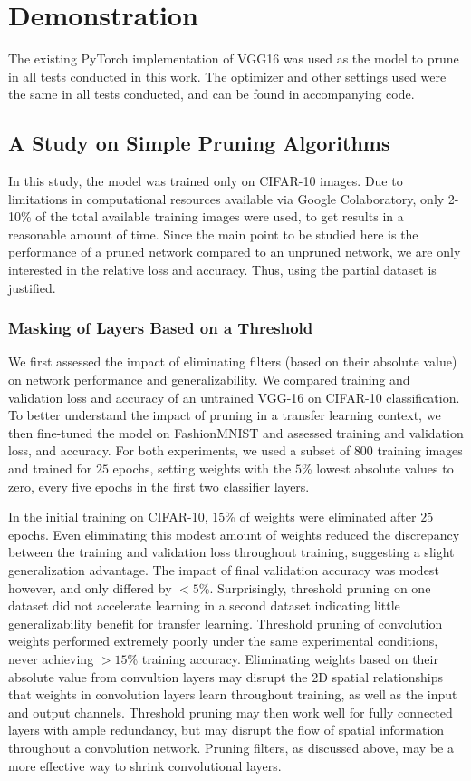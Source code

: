 \documentclass{article}
\begin{document}
\section{Demonstration}

The existing PyTorch implementation of VGG16 was used as the model to prune in all tests conducted in this work. The optimizer and other settings used were the same in all tests conducted, and can be found in accompanying code.

\subsection{A Study on Simple Pruning Algorithms}

In this study, the model was trained only on CIFAR-10 images. Due to limitations in computational resources available via Google Colaboratory, only 2-10\% of the total available training images were used, to get results in a reasonable amount of time. Since the main point to be studied here is the performance of a pruned network compared to an unpruned network, we are only interested in the relative loss and accuracy. Thus, using the partial dataset is justified.

\subsubsection{Masking of Layers Based on a Threshold}

We first assessed the impact of eliminating filters (based on their absolute value) on network performance and generalizability. We compared training and validation loss and accuracy of an untrained VGG-16 on CIFAR-10 classification. To better understand the impact of pruning in a transfer learning context, we then fine-tuned the model on FashionMNIST and assessed training and validation loss, and accuracy. For both experiments, we used a subset of $800$ training images and trained for $25$ epochs, setting weights with the $5$\% lowest absolute values to zero, every five epochs in the first two classifier layers.


In the initial training on CIFAR-10, $15$\% of weights were eliminated after $25$ epochs. Even eliminating this modest amount of weights reduced the discrepancy between the training and validation loss throughout training, suggesting a slight generalization advantage. The impact of final validation accuracy was modest however, and only differed by $<5$\%.   Surprisingly, threshold pruning on one dataset did not accelerate learning in a second dataset indicating little generalizability benefit for transfer learning. Threshold pruning of convolution weights performed extremely poorly under the same experimental conditions, never achieving $>15$\% training accuracy. Eliminating weights based on their absolute value from convultion layers may disrupt the 2D spatial relationships that weights in convolution layers learn throughout training, as well as the input and output channels. Threshold pruning may then work well for fully connected layers with ample redundancy, but may disrupt the flow of spatial information throughout a convolution network. Pruning filters, as discussed above, may be a more effective way to shrink convolutional layers.
\end{document}
